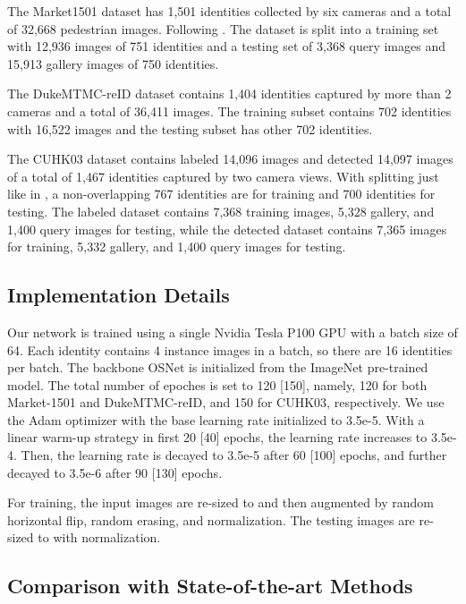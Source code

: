 \documentclass[journal]{IEEEtran}
\begin{document}
The Market1501 dataset  \cite{zheng2015scalable} has 1,501 identities collected by six cameras and a total of 32,668 pedestrian images. Following \cite{zheng2015scalable}. The dataset is split into a training set with 12,936 images of 751 identities and a testing set of 3,368 query images and 15,913 gallery images of 750 identities.

The DukeMTMC-reID dataset \cite{Ristani2016Performance} contains 1,404 identities captured
by more than 2 cameras and a total of 36,411 images. The training subset contains 702 identities with 16,522 images and the testing subset has other 702 identities.

The CUHK03 dataset \cite{Li2014DeepReID} contains labeled 14,096 images and detected 14,097 images of a total of 1,467
identities captured by two camera views. With splitting just like in \cite{zheng2015scalable}, a non-overlapping 767 identities are for training and 700 identities for testing. The labeled dataset contains 7,368 training images, 5,328 gallery, and 1,400 query images for testing, while the detected dataset contains 7,365 images for training, 5,332 gallery, and 1,400 query images for testing.

\subsection{Implementation Details}
Our network is trained using a single Nvidia Tesla P100 GPU with a batch size of 64. Each identity contains 4 instance images in a batch, so there are 16 identities per batch. The backbone OSNet is initialized from the ImageNet pre-trained model. The total number of epoches is set to 120 [150], namely, 120 for both Market-1501 and DukeMTMC-reID,  and 150 for CUHK03, respectively.  We use the Adam optimizer with the base learning rate initialized to 3.5e-5. With a linear warm-up strategy in first 20 [40] epochs, the learning rate increases to 3.5e-4. Then, the learning rate is decayed to 3.5e-5 after 60 [100] epochs, and further decayed to 3.5e-6 after 90 [130] epochs.

For training, the input images are re-sized to  and then augmented by random horizontal flip, random erasing, and normalization. The testing images are re-sized to  with normalization.

\subsection{Comparison with State-of-the-art Methods}
\end{document}
